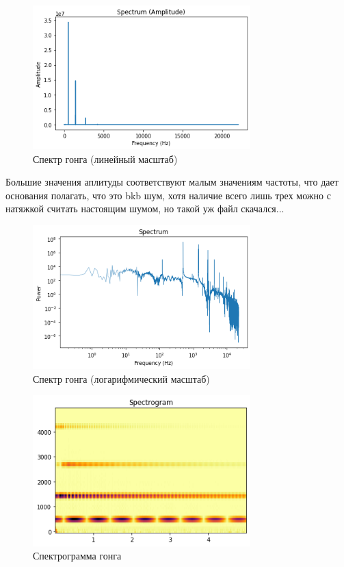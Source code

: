 \documentclass[a4paper,12pt]{report}
\begin{document}
    \begin{figure}[H]
        \centering
        \includegraphics[width=0.75\textwidth]{ex1_gong_spectrum_amplitude.png}
        \caption{Спектр гонга (линейный масштаб)}
        \label{fig:ex1_gong_spectrum_amplitude}
    \end{figure}
    
    Большие значения аплитуды соответствуют малым значениям частоты, что дает основания полагать, что это  bkb  шум, хотя наличие всего лишь трех  можно с натяжкой считать настоящим шумом, но такой уж файл скачался...
    
    \begin{figure}[H]
        \centering
        \includegraphics[width=0.75\textwidth]{ex1_gong_spectrum.png}
        \caption{Спектр гонга (логарифмический масштаб)}
        \label{fig:ex1_gong_spectrum}
    \end{figure}
    
    \begin{figure}[H]
        \centering
        \includegraphics[width=0.75\textwidth]{ex1_gong_spectrogram.png}
        \caption{Спектрограмма гонга}
        \label{fig:ex1_gong_spectrogram}
    \end{figure}
    
\end{document}
